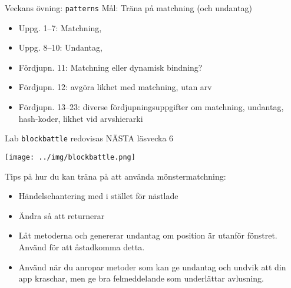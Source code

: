 

\ifkompendium\else
{}

\begin{SlideExtra}{Veckans övning: \texttt{patterns}}
  Mål: Träna på matchning (och undantag)
\begin{itemize}\SlideFontSmall
\item Uppg. 1--7: Matchning, 
\item Uppg. 8--10: Undantag, 
\item Fördjupn. 11: Matchning eller dynamisk bindning?
\item Fördjupn. 12: avgöra likhet med matchning,  utan arv
\item Fördjupn. 13--23: diverse fördjupningsuppgifter om matchning, undantag, hash-koder, likhet vid arvshierarki
\end{itemize}
\end{SlideExtra}


\begin{SlideExtra}{Lab \texttt{blockbattle} redovisas NÄSTA läsvecka 6}
  \begin{minipage}{0.42\textwidth}
        \texttt{[image: ../img/blockbattle.png]}
  \end{minipage}%
  \begin{minipage}{0.59\textwidth}
    \SlideFontSmall Tips på hur du kan träna på att använda mönstermatchning:
    \begin{itemize}\SlideFontSmall
      \item Händelsehantering med  i stället för nästlade 
      \item Ändra så att  returnerar 
      \item Låt metoderna  och  genererar undantag om position är utanför fönstret. Använd  för att åstadkomma detta. 
      \item Använd  när du anropar metoder som kan ge undantag och undvik att din app kraschar, men ge bra felmeddelande som underlättar avlusning.
    \end{itemize}    
  \end{minipage}
\end{SlideExtra}


